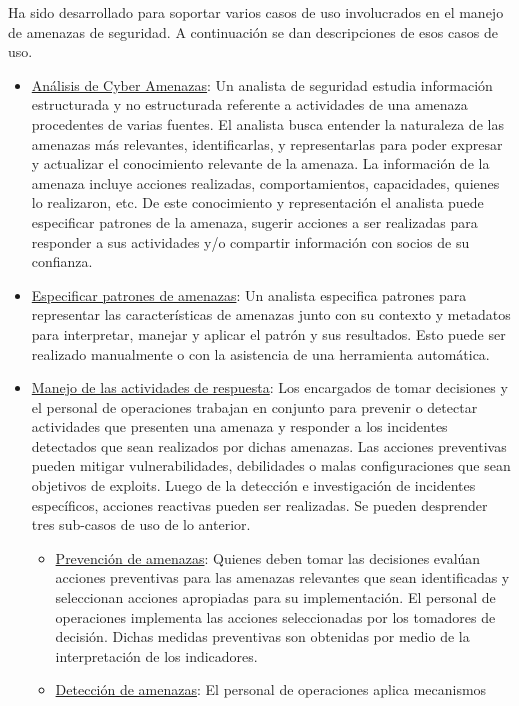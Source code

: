 Ha sido desarrollado para soportar varios casos de uso involucrados en el 
manejo de amenazas de seguridad. A continuación se dan descripciones de esos 
casos de uso.
\begin{itemize}
  \item \underline{Análisis de Cyber Amenazas}: Un analista de seguridad estudia información 
  estructurada y no estructurada referente a actividades de una amenaza 
  procedentes de varias fuentes. El analista busca entender la naturaleza de las 
  amenazas más relevantes, identificarlas, y representarlas para poder expresar 
  y actualizar el conocimiento relevante de la amenaza. La información de la 
  amenaza incluye acciones realizadas, comportamientos, capacidades, quienes lo 
  realizaron, etc. De este conocimiento y representación el analista puede 
  especificar patrones de la amenaza, sugerir acciones a ser realizadas para 
  responder a sus actividades y/o compartir información con socios de su 
  confianza.
  \item \underline{Especificar patrones de amenazas}: Un analista especifica patrones para 
  representar las características de amenazas junto con su contexto y metadatos 
  para interpretar, manejar y aplicar el patrón y sus resultados. Esto puede ser 
  realizado manualmente o con la asistencia de una herramienta automática.
  \item \underline{Manejo de las actividades de respuesta}: Los encargados de tomar decisiones y el personal de operaciones trabajan 
  en conjunto para prevenir o detectar actividades que presenten una amenaza y 
  responder a los incidentes detectados que sean realizados por dichas amenazas. 
  Las acciones preventivas pueden mitigar vulnerabilidades, debilidades o malas 
  configuraciones que sean objetivos de exploits. Luego de la detección e 
  investigación de incidentes específicos, acciones reactivas pueden ser 
  realizadas. Se pueden desprender tres sub-casos de uso de lo anterior.
  \begin{itemize}
    \item \underline{Prevención de amenazas}: Quienes deben tomar las decisiones evalúan 
    acciones preventivas para las amenazas relevantes que sean identificadas y 
    seleccionan acciones apropiadas para su implementación. El personal de 
    operaciones implementa las acciones seleccionadas por los tomadores de 
    decisión. Dichas medidas preventivas son obtenidas por medio de la 
    interpretación de los indicadores.
    \item \underline{Detección de amenazas}: El personal de operaciones aplica mecanismos 

\end{itemize}
\end{itemize}
